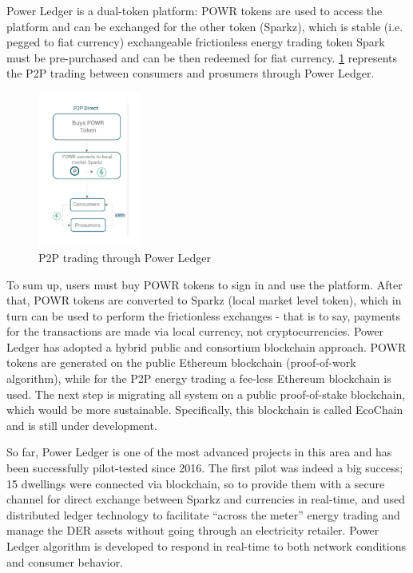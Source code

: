 Power Ledger is a dual-token platform: POWR tokens are used to access the platform and can be exchanged for the other token (Sparkz), which is stable (i.e. pegged to fiat currency) exchangeable frictionless energy trading token Spark must be pre-purchased \cite{powerledgerwhitepaper} and can be then redeemed for fiat currency. \cref{fig:plp2p} represents the \ac{P2P} trading between consumers and prosumers through Power Ledger. 




 \begin{figure}[h]
\centering
\includegraphics[width=0.3\textwidth]{./Images/plp2p}
\caption{\ac{P2P} trading through Power Ledger}
\label{fig:plp2p}
\end{figure}


To sum up, users must buy POWR tokens to sign in and use the platform. After that, POWR tokens are converted to Sparkz (local market level token), which in turn can be used to perform the frictionless exchanges - that is to say, payments for the transactions are made via local currency, not cryptocurrencies. Power Ledger has adopted a hybrid public and consortium blockchain approach. POWR tokens are generated on the public Ethereum blockchain (proof-of-work algorithm), while for the P2P energy trading a fee-less Ethereum blockchain is used. The next step is migrating all system on a public proof-of-stake blockchain, which would be more sustainable. Specifically, this blockchain is called EcoChain and is still under development.



So far, Power Ledger is one of the most advanced projects in this area and has been successfully pilot-tested since 2016. The first pilot was indeed a big success; 15 dwellings were connected via blockchain, so to provide them with a secure channel for direct exchange between Sparkz and currencies in real-time, and used distributed ledger technology to facilitate “across the meter” energy trading and manage the \ac{DER} assets without going through an electricity retailer. Power Ledger algorithm is developed to respond in real-time to both network conditions and consumer behavior.   


